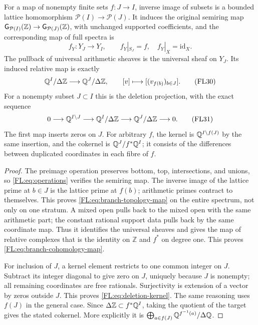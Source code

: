 \begin{proposition}
\label{FL:prop:deletions}
For a map of nonempty finite sets $f:J\to I$, inverse image of subsets
is a bounded lattice homomorphism $\mathcal P(I)\to\mathcal P(J)$.
It induces the original semiring map
$\mathsf G_{\mathcal P(I)}(\mathbb Z)\to\mathsf G_{\mathcal P(J)}(\mathbb Z)$,
with unchanged supported coefficients, and the corresponding map of
full spectra is
\[
 f_Y:Y_J\to Y_I,\qquad f_Y|_{S_J}=f,\quad f_Y|_X=\mathrm{id}_X.
 \tag{FL29}\label{FL:eq:branch-topology-map}
\]
The pullback of universal arithmetic sheaves is the universal sheaf
on $Y_J$. Its induced relative map is exactly
\[
 \mathbb Q^I/\Delta\mathbb Z\longrightarrow\mathbb Q^J/\Delta\mathbb Z,
 \qquad [v]\longmapsto[(v_{f(b)})_{b\in J}].
 \tag{FL30}\label{FL:eq:branch-cohomology-map}
\]
For a nonempty subset $J\subset I$ this is the deletion projection,
with the exact sequence
\[
 0\longrightarrow\mathbb Q^{I\setminus J}
 \longrightarrow\mathbb Q^I/\Delta\mathbb Z
 \longrightarrow\mathbb Q^J/\Delta\mathbb Z\longrightarrow0.
 \tag{FL31}\label{FL:eq:deletion-kernel}
\]
The first map inserts zeros on $J$. For arbitrary $f$, the kernel
is $\mathbb Q^{I\setminus f(J)}$ by the same insertion, and the cokernel is
$\mathbb Q^J/f^*\mathbb Q^I$; it consists of the differences between duplicated
coordinates in each fibre of $f$.
\end{proposition}
\begin{proof}
The preimage operation preserves bottom, top, intersections, and
unions, so \eqref{FL:eq:operations} verifies the semiring map. The
inverse image of the lattice prime at $b\in J$ is the lattice prime
at $f(b)$; arithmetic primes contract to themselves. This proves
\eqref{FL:eq:branch-topology-map} on the entire spectrum, not only on
one stratum. A mixed open pulls back to the mixed open with the same
arithmetic part; the constant rational support data pulls back by
the same coordinate map. Thus it identifies the universal sheaves
and gives the map of relative complexes that is the identity on
$\mathbb Z$ and $f^*$ on degree one. This proves
\eqref{FL:eq:branch-cohomology-map}.

For inclusion of $J$, a kernel element restricts to one common integer
on $J$. Subtract its integer diagonal to give zero on $J$, uniquely
because $J$ is nonempty; all remaining coordinates are free rationals.
Surjectivity is extension of a vector by zeros outside $J$. This proves
\eqref{FL:eq:deletion-kernel}. The same reasoning uses $f(J)$ in the
general case. Since $\Delta\mathbb Z\subset f^*\mathbb Q^I$, taking the
quotient of the target gives the stated cokernel. More explicitly it
is $\bigoplus_{a\in f(J)}\mathbb Q^{f^{-1}(a)}/\Delta\mathbb Q$.
\end{proof}

